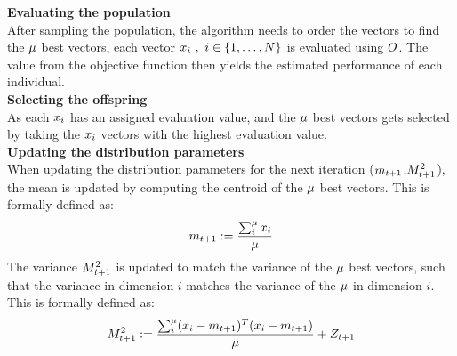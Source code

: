 \textbf{Evaluating the population}\\
After sampling the population, the algorithm needs to order the vectors to find the $\mu$ best vectors, each vector $x_{i}\ ,\ i \in \{1, \dots, N\}$ is evaluated using $O$. 
The value from the objective function then yields 
the estimated performance of each individual.
\\

\textbf{Selecting the offspring}\\
As each $x_{i}$ has an assigned evaluation value, and the $\mu$ best vectors gets selected by taking the $x_{i}$ vectors with the highest evaluation value.
\\

\textbf{Updating the distribution parameters}\\
When updating the distribution parameters for the next iteration
($m_{t + 1}$,$M^2_{t + 1}$), 
the mean is updated by computing the centroid of the 
$\mu$ best vectors. This is formally defined as:
\begin{align*}
m_{t +1}:=\frac{\sum_{i}^{\mu} x_{i}}{\mu}
\end{align*}
The variance $M^2_{t + 1}$ is updated 
to match the variance of the $\mu$ best
vectors, such that the variance in dimension $i$ 
matches the variance of the $\mu$
in dimension $i$.
This is formally defined as:
\begin{align*}
M^2_{t +1}:=\frac{\sum_{i}^{\mu}
(x_{i} - m_{t +1})^T(x_{i} - m_{t +1})}{\mu} + Z_{t + 1}
\end{align*}
\\

